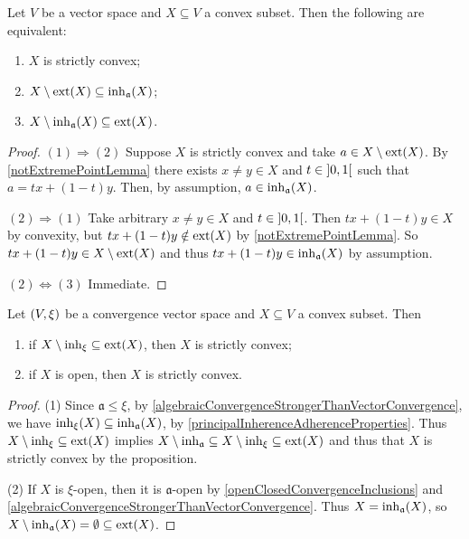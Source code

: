 \begin{proposition} \label{strictConvexityEquivalentsConvexSubset}
Let $V$ be a vector space and $X\subseteq V$ a convex subset.
Then the following are equivalent:
\begin{enumerate}
\item $X$ is strictly convex;
\item $X\setminus \operatorname{ext}(X) \subseteq \operatorname{inh}_\mathfrak{a}(X)$;
\item $X\setminus \operatorname{inh}_\mathfrak{a}(X) \subseteq \operatorname{ext}(X)$.
\end{enumerate}
\end{proposition}
\begin{proof}
$(1) \Rightarrow (2)$ Suppose $X$ is strictly convex and take $a\in X\setminus \operatorname{ext}(X)$. By \ref{notExtremePointLemma} there exists $x\neq y\in X$ and $t\in\interval[o]{0,1}$ such that $a  = tx+(1-t)y$. Then, by assumption, $a\in \operatorname{inh}_\mathfrak{a}(X)$.

$(2) \Rightarrow (1)$ Take arbitrary $x\neq y\in X$ and $t\in \interval[o]{0,1}$. Then $tx+(1-t)y\in X$ by convexity, but $tx+(1-t)y\notin \operatorname{ext}(X)$ by \ref{notExtremePointLemma}. So $tx+(1-t)y \in X\setminus \operatorname{ext}(X)$ and thus $tx+(1-t)y\in \operatorname{inh}_\mathfrak{a}(X)$ by assumption.

$(2) \Leftrightarrow (3)$ Immediate.
\end{proof}
\begin{corollary}
Let $\sSet{V,\xi}$ be a convergence vector space and $X\subseteq V$ a convex subset. Then
\begin{enumerate}
\item if $X\setminus \operatorname{inh}_\xi \subseteq \operatorname{ext}(X)$, then $X$ is strictly convex;
\item if $X$ is open, then $X$ is strictly convex.
\end{enumerate}
\end{corollary}
\begin{proof}
(1) Since $\mathfrak{a}\leq \xi$, by \ref{algebraicConvergenceStrongerThanVectorConvergence}, we have $\operatorname{inh}_\xi(X)\subseteq \operatorname{inh}_\mathfrak{a}(X)$, by \ref{principalInherenceAdherenceProperties}. Thus $X\setminus \operatorname{inh}_\xi \subseteq \operatorname{ext}(X)$ implies $X\setminus \operatorname{inh}_\mathfrak{a}\subseteq X\setminus \operatorname{inh}_\xi \subseteq \operatorname{ext}(X)$ and thus that $X$ is strictly convex by the proposition.

(2) If $X$ is $\xi$-open, then it is $\mathfrak{a}$-open by \ref{openClosedConvergenceInclusions} and \ref{algebraicConvergenceStrongerThanVectorConvergence}. Thus $X = \operatorname{inh}_\mathfrak{a}(X)$, so $X\setminus \operatorname{inh}_\mathfrak{a}(X) = \emptyset \subseteq \operatorname{ext}(X)$.
\end{proof}

